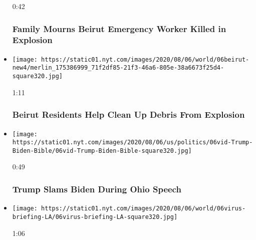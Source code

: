 \begin{itemize}
  0:42

  \hypertarget{family-mourns-beirut-emergency-worker-killed-in-explosion}{%
  \subsubsection{Family Mourns Beirut Emergency Worker Killed in
  Explosion}\label{family-mourns-beirut-emergency-worker-killed-in-explosion}}
\item
  \href{https://www.nytimes.com/video/us/100000007277332/beirut-residents-clean.html?action=click\&module=video-series-bar\&region=header\&pgtype=Article\&playlistId=video/latest-video}{}

  \texttt{[image: https://static01.nyt.com/images/2020/08/06/world/06beirut-new4/merlin\_175386999\_71f2df85-21f3-46a6-805e-38a6673f25d4-square320.jpg]}

  1:11

  \hypertarget{beirut-residents-help-clean-up-debris-from-explosion}{%
  \subsubsection{Beirut Residents Help Clean Up Debris From
  Explosion}\label{beirut-residents-help-clean-up-debris-from-explosion}}
\item
  \href{https://www.nytimes.com/video/us/politics/100000007276768/trump-biden-god-ohio.html?action=click\&module=video-series-bar\&region=header\&pgtype=Article\&playlistId=video/latest-video}{}

  \texttt{[image: https://static01.nyt.com/images/2020/08/06/us/politics/06vid-Trump-Biden-Bible/06vid-Trump-Biden-Bible-square320.jpg]}

  0:49

  \hypertarget{trump-slams-biden-during-ohio-speech}{%
  \subsubsection{Trump Slams Biden During Ohio
  Speech}\label{trump-slams-biden-during-ohio-speech}}
\item
  \href{https://www.nytimes.com/video/us/100000007276385/la-mayor-electricity-house-parties.html?action=click\&module=video-series-bar\&region=header\&pgtype=Article\&playlistId=video/latest-video}{}

  \texttt{[image: https://static01.nyt.com/images/2020/08/06/world/06virus-briefing-LA/06virus-briefing-LA-square320.jpg]}

  1:06


\end{itemize}
